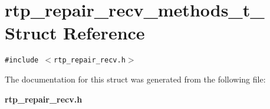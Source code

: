 \section{rtp\_\-repair\_\-recv\_\-methods\_\-t\_\- Struct Reference}
\label{structrtp__repair__recv__methods__t__}
{\tt \#include $<$rtp\_\-repair\_\-recv.h$>$}



The documentation for this struct was generated from the following file:\begin{CompactItemize}
\item 
\bf{rtp\_\-repair\_\-recv.h}\end{CompactItemize}
